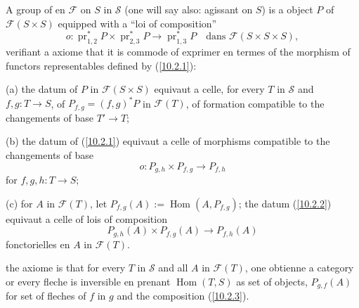 \documentclass[12pt,a4paper]{article}
\theoremstyle{plain}
\theoremstyle{definition}
\theoremstyle{remark}
\DeclareMathOperator{\Hom}{Hom}
\DeclareMathOperator{\pr}{pr}
\begin{document}
A group of en $\mathcal{F}$ on $S$ in $\mathcal{S}$ (one will say also: agissant on $S$) is a object $P$ of $\mathcal{F}(S \times S)$ equipped with a ``loi of composition''
\begin{equation}\label{10.2.1}
o: \pr_{1,2}^* P \times \pr_{2,3}^* P \longrightarrow \pr_{1,3}^* P \quad \text{dans } \mathcal{F}(S \times S \times S), \tag{10.2.1}
\end{equation}
verifiant a axiome that it is commode of exprimer en termes of the morphism of functors representables defined by (\ref{10.2.1}):

(a) the datum of $P$ in $\mathcal{F}(S \times S)$ equivaut a celle, for every $T$ in $\mathcal{S}$ and $f, g: T \to S$, of $P_{f,g} = (f,g)^* P$ in $\mathcal{F}(T)$, of formation compatible to the changements of base $T' \to T$;

(b) the datum of (\ref{10.2.1}) equivaut a celle of morphisms compatible to the changements of base
\begin{equation}\label{10.2.2}
o: P_{g,h} \times P_{f,g} \longrightarrow P_{f,h} \tag{10.2.2}
\end{equation}
for $f, g, h: T \to S$;

(c) for $A$ in $\mathcal{F}(T)$, let $P_{f,g}(A) := \Hom(A, P_{f,g})$; the datum (\ref{10.2.2}) equivaut a celle of lois of composition
\begin{equation}\label{10.2.3}
P_{g,h}(A) \times P_{f,g}(A) \longrightarrow P_{f,h}(A) \tag{10.2.3}
\end{equation}
fonctorielles en $A$ in $\mathcal{F}(T)$.

the axiome is that for every $T$ in $\mathcal{S}$ and all $A$ in $\mathcal{F}(T)$, one obtienne a category or every fleche is inversible en prenant $\Hom(T, S)$ as set of objects, $P_{g,f}(A)$ for set of fleches of $f$ in $g$ and the composition (\ref{10.2.3}).
\end{document}
